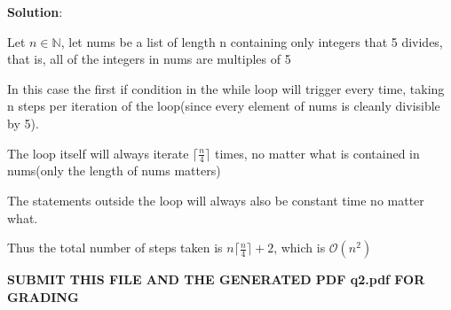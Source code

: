 \documentclass{article}
\newcommand{\cO}{\mathcal{O}}
\begin{document}
\begin{enumerate}
\textbf{Solution}:

Let $n \in \mathbb{N}$, let nums be a list of length n containing only integers that 5 divides, that is, all of the integers in nums are multiples of 5

In this case the first if condition in the while loop will trigger every time, taking n steps per iteration of the loop(since every element of nums is cleanly divisible by 5).

The loop itself will always iterate $\lceil \frac{n}{4} \rceil$ times, no matter what is contained in nums(only the length of nums matters)

The statements outside the loop will always also be constant time no matter what.

Thus the total number of steps taken is $n \lceil \frac{n}{4} \rceil + 2$, which is $\cO (n^2)$

\end{enumerate}
\begin{center}
\textbf{SUBMIT THIS FILE AND THE GENERATED PDF q2.pdf FOR GRADING}
\end{center}
\end{document}
